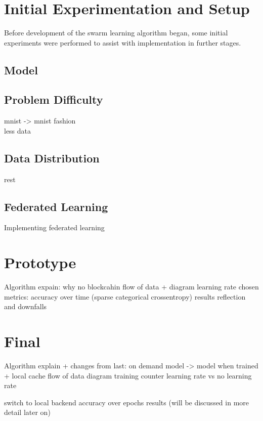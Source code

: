 \section{Initial Experimentation and Setup}
Before development of the swarm learning algorithm began, some initial experiments were performed to assist with implementation in further stages.
\subsection{Model}
\subsection{Problem Difficulty}
mnist -> mnist fashion \\
less data
\subsection{Data Distribution}
rest
\subsection{Federated Learning}
Implementing federated learning


\section{Prototype}
Algorithm expain:
why no blockcahin
flow of data + diagram
learning rate
chosen metrics:
accuracy over time (sparse categorical crossentropy)
results
reflection and downfalls

\section{Final}
Algorithm explain + changes from last:
on demand model -> model when trained + local cache
flow of data diagram
training counter
learning rate vs no learning rate

switch to local backend
accuracy over epochs
results (will be discussed in more detail later on)